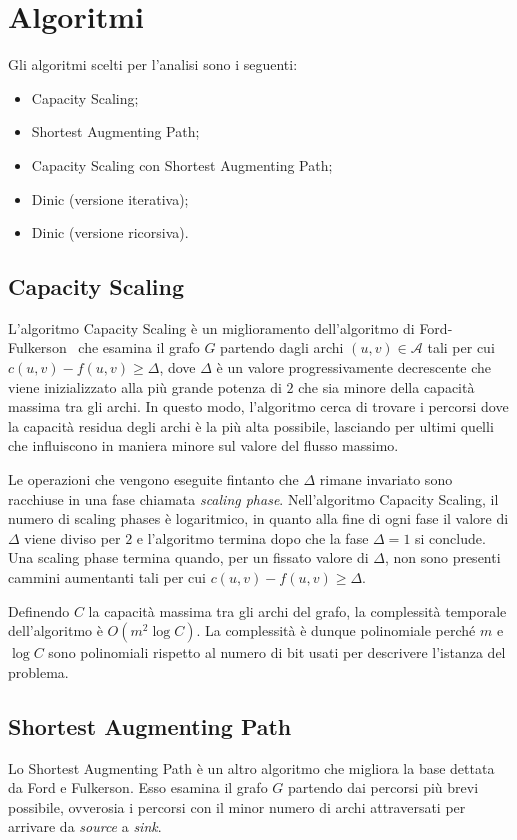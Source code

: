 \documentclass[11pt]{report}
\newcommand{\set}[1]{\mathcal{#1}}
\begin{document}
    \chapter{Algoritmi}\label{ch:algoritmi}
    Gli algoritmi scelti per l'analisi sono i seguenti:
    \begin{itemize}
        \item Capacity Scaling;
        \item Shortest Augmenting Path;
        \item Capacity Scaling con Shortest Augmenting Path;
        \item Dinic (versione iterativa);
        \item Dinic (versione ricorsiva).
    \end{itemize}

    \section{Capacity Scaling}\label{sec:cs}
    L'algoritmo Capacity Scaling è un miglioramento dell'algoritmo di Ford-Fulkerson~\cite{Ford_Fulkerson} che esamina il grafo $G$ partendo dagli archi $(u,v)\in \set A$ tali per cui $c(u,v)-f(u,v)\ge\Delta$, dove $\Delta$ è un valore progressivamente decrescente che viene inizializzato alla più grande potenza di $2$ che sia minore della capacità massima tra gli archi.
    In questo modo, l'algoritmo cerca di trovare i percorsi dove la capacità residua degli archi è la più alta possibile, lasciando per ultimi quelli che influiscono in maniera minore sul valore del flusso massimo.

    Le operazioni che vengono eseguite fintanto che $\Delta$ rimane invariato sono racchiuse in una fase chiamata \textit{scaling phase}.
    Nell'algoritmo Capacity Scaling, il numero di scaling phases è logaritmico, in quanto alla fine di ogni fase il valore di $\Delta$ viene diviso per $2$ e l'algoritmo termina dopo che la fase $\Delta=1$ si conclude.
    Una scaling phase termina quando, per un fissato valore di $\Delta$, non sono presenti cammini aumentanti tali per cui $c(u,v)-f(u,v)\ge\Delta$.

    Definendo $C$ la capacità massima tra gli archi del grafo, la complessità temporale dell'algoritmo è $O(m^{2}\log C)$. La complessità è dunque polinomiale perché $m$ e $\log C$ sono polinomiali rispetto al numero di bit usati per descrivere l'istanza del problema.

    \section{Shortest Augmenting Path}\label{sec:sap}
    Lo Shortest Augmenting Path è un altro algoritmo che migliora la base dettata da Ford e Fulkerson. Esso esamina il grafo $G$ partendo dai percorsi più brevi possibile, ovverosia i percorsi con il minor numero di archi attraversati per arrivare da \textit{source} a \textit{sink}.
\end{document}

